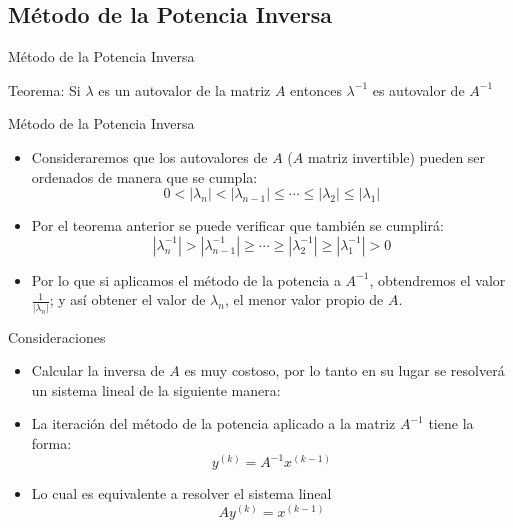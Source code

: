 \documentclass[11pt]{beamer}
\begin{document}
  \subsection{M\'etodo de la Potencia Inversa}
  \begin{frame}{M\'etodo de la Potencia Inversa}
    \begin{block}{Teorema:}
      Si $\lambda$ es un autovalor de la matriz $A$ entonces $\lambda^{-1}$ es autovalor
      de $A^{-1}$
      \end{block}
\end{frame}
\begin{frame}{M\'etodo de la Potencia Inversa}
  \begin{itemize}
    \item Consideraremos que los autovalores de $A$ ($A$ matriz invertible) pueden ser ordenados de manera que se cumpla:
    $$
    0 < |\lambda_n| < |\lambda_{n-1}| \leq \cdots \leq |\lambda_2| \leq |\lambda_1|
    $$
    \item<2-> Por el teorema anterior se puede verificar que tambi\'en se cumplir\'a:
    $$
    |\lambda_n^{-1}| > |\lambda_{n-1}^{-1}| \geq \cdots \geq |\lambda_2^{-1}| \geq |\lambda_1^{-1}| > 0
    $$
    \item<3-> Por lo que si aplicamos el m\'etodo de la potencia a $A^{-1}$, obtendremos el
    valor $\frac{1}{|\lambda_n|}$; y así obtener el valor de $\lambda_n$, el menor valor propio de $A$.
  \end{itemize}
  \end{frame}  
  \begin{frame}{Consideraciones}
    \begin{itemize}
      \item<1-> Calcular la inversa de $A$ es muy costoso, por lo tanto en su lugar se 
      resolver\'a un sistema lineal de la  siguiente manera:
      \item<2-> La iteraci\'on del m\'etodo de la potencia aplicado a la matriz $A^{-1}$ tiene la forma:
      $$
      y^{(k)} = A^{-1}x^{(k-1)} 
      $$
      \item<3-> Lo cual es equivalente a resolver el sistema lineal 
      $$
      Ay^{(k)} = x^{(k-1)}
      $$
    \end{itemize}    
  \end{frame}
\end{document}
